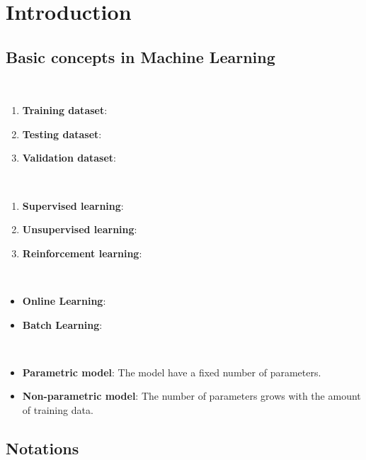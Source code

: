\setcounter{chapter}{-1}

\chapter{Introduction}

\section{Basic concepts in Machine Learning} \label{sec:}
\begin{definition}[Dataset] ~
    \begin{enumerate}
        \item \textbf{Training dataset}:
        \item \textbf{Testing dataset}:
        \item \textbf{Validation dataset}:
    \end{enumerate}
\end{definition}

\begin{definition} ~
\begin{enumerate}
    \item \textbf{Supervised learning}:
    \item \textbf{Unsupervised learning}:
    \item \textbf{Reinforcement learning}:
\end{enumerate}
\end{definition}

\begin{definition} ~
    \begin{itemize}
        \item \textbf{Online Learning}:
        \item \textbf{Batch Learning}:
    \end{itemize}
\end{definition}


\begin{definition} ~
    \begin{itemize}
        \item \textbf{Parametric model}: The model have a fixed number of parameters.
        \item \textbf{Non-parametric model}: The number of parameters grows with the amount of training data.
    \end{itemize}
\end{definition}

\section{Notations} \label{sec:}



